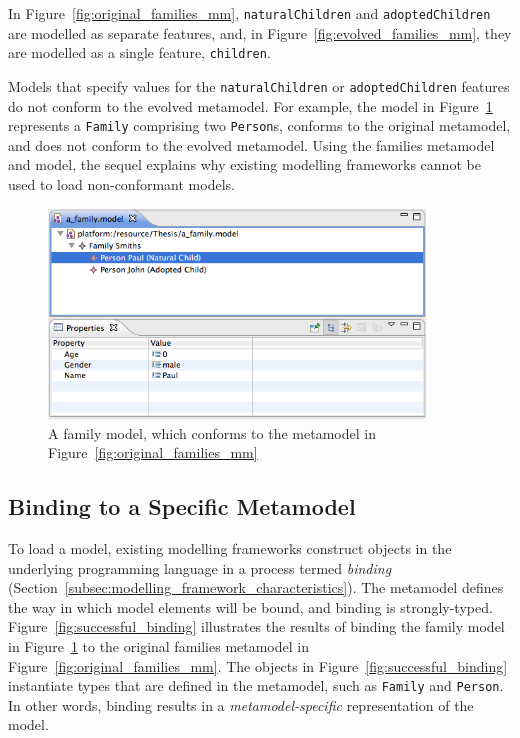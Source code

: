In Figure~\ref{fig:original_families_mm}, \texttt{na\-tu\-r\-alCh\-il\-dr\-en} and \texttt{ad\-op\-t\-edCh\-il\-dr\-en} are modelled as separate features, and, in Figure~\ref{fig:evolved_families_mm}, they are modelled as a single feature, \texttt{ch\-il\-dr\-en}.

Models that specify values for the \texttt{na\-tu\-r\-alCh\-il\-dr\-en} or \texttt{ad\-op\-t\-edCh\-il\-dr\-en} features do not conform to the evolved metamodel. For example, the model in Figure~\ref{fig:families_model} represents a \texttt{Fa\-mi\-ly} comprising two \texttt{Pe\-rs\-on}s, conforms to the original metamodel, and does not conform to the evolved metamodel. Using the families metamodel and model, the sequel explains why existing modelling frameworks cannot be used to load non-conformant models.

\begin{figure}[htbp]
  \begin{center}
    \leavevmode
    \includegraphics[width=10cm]{5.Implementation/images/family_model.png}
  \end{center}
  \caption[A family model]{A family model, which conforms to the metamodel in Figure~\ref{fig:original_families_mm}}
  \label{fig:families_model}
\end{figure}


\subsection{Binding to a Specific Metamodel}
\label{subsec:binding_specific}
To load a model, existing modelling frameworks construct objects in the underlying programming language in a process termed \emph{binding} (Section~\ref{subsec:modelling_framework_characteristics}). The metamodel defines the way in which model elements will be bound, and binding is strongly-typed. Figure~\ref{fig:successful_binding} illustrates the results of binding the family model in Figure~\ref{fig:families_model} to the original families metamodel in Figure~\ref{fig:original_families_mm}. The objects in Figure~\ref{fig:successful_binding} instantiate types that are defined in the metamodel, such as \texttt{Fa\-mi\-ly} and \texttt{Pe\-rs\-on}. In other words, binding results in a \emph{metamodel-specific} representation of the model.

